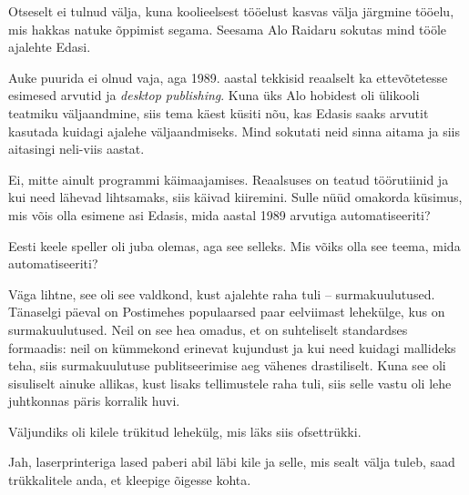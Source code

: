 
Otseselt ei tulnud välja, kuna koolieelsest tööelust kasvas välja järgmine 
tööelu, mis hakkas natuke õppimist segama. Seesama Alo 
Raidaru sokutas mind tööle ajalehte 
Edasi.


Auke puurida ei olnud vaja, aga 1989. aastal tekkisid 
reaalselt ka ettevõtetesse esimesed arvutid ja 
\emph{desktop publishing}. Kuna üks Alo hobidest oli ülikooli teatmiku väljaandmine, siis tema käest küsiti nõu, kas Edasis saaks arvutit 
kasutada kuidagi ajalehe väljaandmiseks. Mind sokutati neid
sinna aitama ja siis aitasingi neli-viis aastat.


Ei, mitte ainult programmi käimaajamises. Reaalsuses on teatud töörutiinid ja kui need lähevad lihtsamaks, siis käivad kiiremini. Sulle nüüd 
omakorda küsimus, mis võis olla esimene asi Edasis, 
mida aastal 1989 arvutiga automatiseeriti?


Eesti keele speller oli juba olemas, aga see selleks. Mis võiks olla see 
teema, mida automatiseeriti?


Väga lihtne, see oli see valdkond, kust ajalehte raha tuli -- surmakuulutused. 
Tänaselgi päeval on Postimehes populaarsed paar eelviimast lehekülge, kus on 
surmakuulutused. Neil on see hea omadus, et on suhteliselt standardses 
formaadis: neil on kümmekond erinevat 
kujundust ja kui need kuidagi mallideks teha, siis 
surmakuulutuse publitseerimise aeg vähenes drastiliselt. Kuna see oli 
sisuliselt ainuke allikas, kust lisaks tellimustele raha tuli, siis selle vastu 
oli lehe juhtkonnas päris korralik huvi.


Väljundiks oli kilele trükitud lehekülg, mis läks siis ofsettrükki.


Jah, laserprinteriga lased paberi abil läbi kile ja selle, mis sealt välja tuleb, 
saad trükkalitele anda, et kleepige õigesse kohta.

